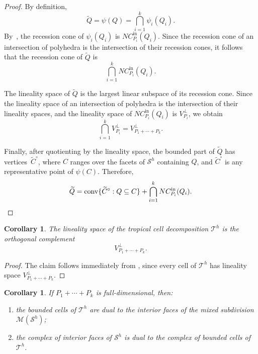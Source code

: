 \documentclass[12pt, reqno]{amsart}
\theoremstyle{plain}
\newtheorem{corollary}[theorem]{Corollary}
\theoremstyle{definition}
\numberwithin{equation}{section}
\begin{document}
\begin{proof}
By definition,
\[
\widetilde{Q}=\psi(Q)=\bigcap_{i=1}^k\psi_i(Q_i).
\]
By~, the recession cone of $\psi_i(Q_i)$ is $NC_{P_i}^{\mathrm{in}}(Q_i)$. Since the recession cone of an intersection of polyhedra is the intersection of their recession cones, it follows that the recession cone of $\widetilde{Q}$ is
\[
\bigcap_{i=1}^k NC_{P_i}^{\mathrm{in}}(Q_i).
\]

The lineality space of $\widetilde{Q}$ is the largest linear subspace of its recession cone. Since the lineality space of an intersection of polyhedra is the intersection of their lineality spaces, and the lineality space of $NC_{P_i}^{\mathrm{in}}(Q_i)$ is $V_{P_i}^{\perp}$, we obtain
\[
\bigcap_{i=1}^k V_{P_i}^{\perp} = V_{P_1+\cdots+P_k}^{\perp}.
\]

Finally, after quotienting by the lineality space, the bounded part of $\widetilde{Q}$ has vertices~$\widetilde{C}^{\circ}$, where $C$ ranges over the facets of $\mathcal{S}^h$ containing $Q$, and $\widetilde{C}^{\circ}$ is any representative point of $\psi(C)$. Therefore,
\[
\widetilde{Q}
=
\operatorname{conv}\{\widetilde{C}^{\circ}:Q\subseteq C\}
+
\bigcap_{i=1}^k NC_{P_i}^{\mathrm{in}}(Q_i).
\qedhere
\]
\end{proof}

\begin{corollary}
The lineality space of the tropical cell decomposition $\mathscr{T}^h$ is the orthogonal complement
\[
V_{P_1+\cdots+P_k}^{\perp}.
\]
\end{corollary}

\begin{proof}
The claim follows immediately from , since every cell of $\mathscr{T}^h$ has lineality space $V_{P_1+\cdots+P_k}^{\perp}$.
\end{proof}

\begin{corollary}\label{cor_inteorior_vs_tropBounded}
If $P_1+\cdots+P_k$ is full-dimensional, then:
\begin{enumerate}
    \item the bounded cells of $\mathscr{T}^h$ are dual to the interior faces of the mixed subdivision $\mathcal{M}(\mathcal{S}^h)$; \item the complex of interior faces of $\mathcal{S}^h$ is dual to the complex of bounded cells of $\mathscr{T}^h$.
\end{enumerate}
\end{corollary}
\end{document}
